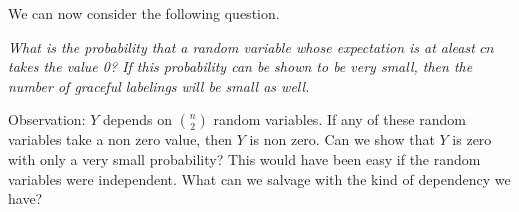 \documentclass[letterpaper, 12pt]{article}
\newcommand{\1}{\mathds{1}}	%
\theoremstyle{definition}
\begin{document}
We can now consider the following question.

{\it{ What is the probability that a random variable whose expectation is at aleast  $cn$ takes the value 0?} If this probability can be shown to be very small, then the number of graceful labelings will be small as well.}

Observation: $Y$ depends on $\binom{n}{2}$ random variables. If any of these random variables take a non zero value, then $Y$ is non zero. Can we show
that $Y$ is zero with only a very small probability? This would have been easy if the random variables were independent. What can we salvage with the kind of dependency we have?


\end{document}
